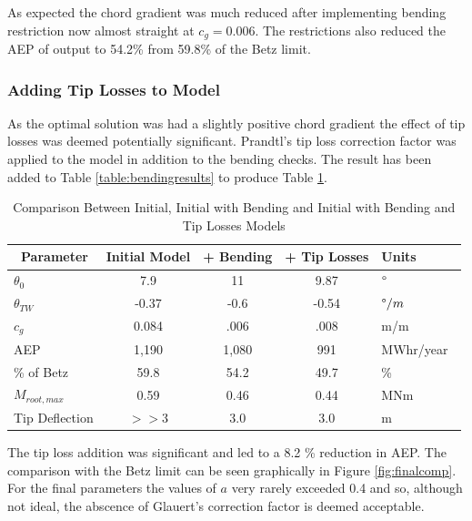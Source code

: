 \documentclass[11pt]{article}
\newcommand{\ra}[1]{\renewcommand{\arraystretch}{#1}}
\begin{document}
As expected the chord gradient was much reduced after implementing bending restriction now almost straight  at $c_g = 0.006$. The restrictions also reduced the AEP of output to \mbox{54.2\%}  from \mbox{59.8\%} of the Betz limit. \\

\subsubsection{Adding Tip Losses to Model}

As the optimal solution was had a slightly positive chord gradient the effect of tip losses was deemed potentially significant. Prandtl's tip loss correction factor was applied to the model in addition to the bending checks. The result has been added to Table \ref{table:bendingresults} to produce Table \ref{table:finalresults}. 

\begin{table}[!h]
\centering %
\ra{1.3}
\begin{tabular}{@{}lcccl@{}}\toprule
\ \textbf{Parameter}  & \textbf{Initial Model}  & \textbf{+ Bending } & \textbf{+ Tip Losses} & \textbf{Units} \\
\midrule
$\theta_0$  & 7.9 & 11 & 9.87 & $\degree$ \ \\
$\theta_{TW}$ & -0.37 & -0.6 & -0.54 & $\degree/m$  \\
$c_{g}$ & 0.084 & .006 & .008 & m/m \ \\
\midrule
AEP  & 1,190 & 1,080 & 991 & MWhr/year\ \\
\% of Betz & 59.8 & 54.2 & 49.7 & \% \ \\
\midrule
$M_{root,max}$ & 0.59 & 0.46 & 0.44 & MNm \\
Tip Deflection  & $>>3$ & 3.0 & 3.0 & m \\
\bottomrule
\end{tabular}
\caption{Comparison Between Initial, Initial with Bending and Initial with Bending and Tip Losses Models}
\label{table:finalresults}
\end{table}

The tip loss addition was significant and led to a 8.2 \% reduction in AEP. The comparison with the Betz limit can be seen graphically in Figure \ref{fig:finalcomp}. For the final parameters the values of $a$ very rarely exceeded 0.4 and so, although not ideal, the abscence of Glauert's correction factor is deemed acceptable.
\end{document}
